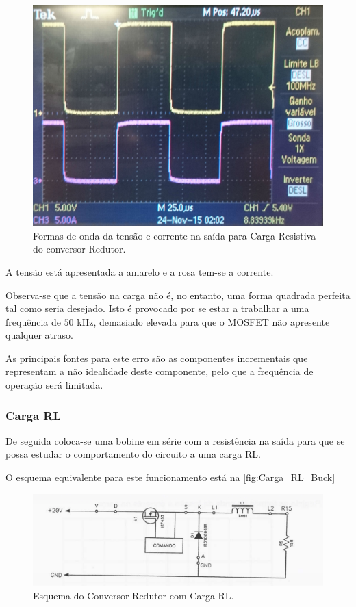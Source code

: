\documentclass[a4paper,11pt]{article}
\numberwithin{equation}{section}
\begin{document}
\begin{figure}[h]
	\centering
	\includegraphics[keepaspectratio=true, scale=0.13]{img/figs/tensao_corrente_carga_buckR}
	\caption{Formas de onda da tensão e corrente na saída para Carga Resistiva do conversor Redutor.}
	\label{fig:tensao_corrente_carga_buckR}
	\vspace{-0.8em}
\end{figure} 

A tensão está apresentada a amarelo e a rosa tem-se a corrente.

Observa-se que a tensão na carga não é, no entanto, uma forma quadrada perfeita tal como seria desejado. Isto é provocado por se estar a trabalhar a uma frequência de $50$ kHz, demasiado elevada para que o MOSFET não apresente qualquer atraso. 

As principais fontes para este erro são as componentes incrementais que representam a não idealidade deste componente, pelo que a frequência de operação será limitada.

\subsubsection{Carga RL}

De seguida coloca-se uma bobine em série com a resistência na saída para que se possa estudar o comportamento do circuito a uma carga RL.

O esquema equivalente para este funcionamento está na \autoref{fig:Carga_RL_Buck}

\begin{figure}[h]
	\centering
	\includegraphics[keepaspectratio=true, scale=0.8]{teoricas/Carga_RL_Buck}
	\caption{Esquema do Conversor Redutor com Carga RL.}
	\label{fig:Carga_RL_Buck}
	\vspace{-0.8em}
\end{figure}
\end{document}
